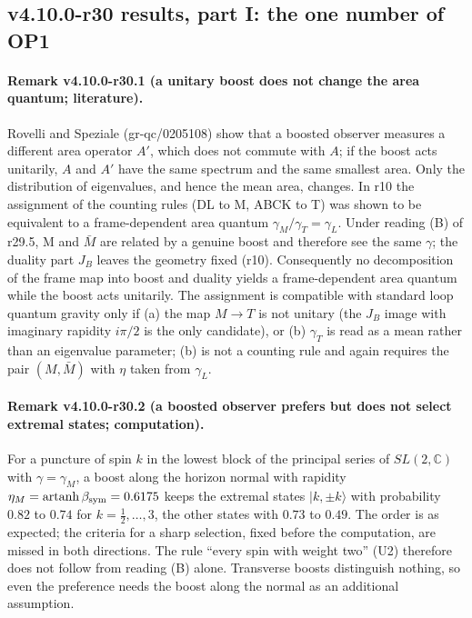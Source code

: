 \subsection*{v4.10.0-r30 results, part I: the one number of OP1}
\label{subsec:v4100-r30-results-op1}

\paragraph{Remark v4.10.0-r30.1 (a unitary boost does not change the area quantum; literature).}
Rovelli and Speziale (gr-qc/0205108) show that a boosted observer measures a different area operator \(A'\), which does not commute with \(A\); if the
boost acts unitarily, \(A\) and \(A'\) have the same spectrum and the same smallest area.  Only the distribution of eigenvalues, and hence the mean
area, changes.  In r10 the assignment of the counting rules (DL to M, ABCK to T) was shown to be equivalent to a frame-dependent area quantum
\(\gamma_M/\gamma_T=\gamma_L\).  Under reading (B) of r29.5, M and \(\bar M\) are related by a genuine boost and therefore see the same \(\gamma\);
the duality part \(J_B\) leaves the geometry fixed (r10).  Consequently no decomposition of the frame map into boost and duality yields a
frame-dependent area quantum while the boost acts unitarily.  The assignment is compatible with standard loop quantum gravity only if
(a) the map \(M\to T\) is not unitary (the \(J_B\) image with imaginary rapidity \(i\pi/2\) is the only candidate), or (b) \(\gamma_T\) is read as a
mean rather than an eigenvalue parameter; (b) is not a counting rule and again requires the pair \((M,\bar M)\) with \(\eta\) taken from \(\gamma_L\).

\paragraph{Remark v4.10.0-r30.2 (a boosted observer prefers but does not select extremal states; computation).}
For a puncture of spin \(k\) in the lowest block of the principal series of \(SL(2,\mathbb C)\) with \(\gamma=\gamma_M\), a boost along the horizon
normal with rapidity \(\eta_M=\operatorname{artanh}\beta_{\rm sym}=0.6175\) keeps the extremal states \(|k,\pm k\rangle\) with probability
\(0.82\) to \(0.74\) for \(k=\tfrac12,\dots,3\), the other states with \(0.73\) to \(0.49\).  The order is as expected; the criteria for a sharp
selection, fixed before the computation, are missed in both directions.  The rule ``every spin with weight two'' (U2) therefore does not follow from
reading (B) alone.  Transverse boosts distinguish nothing, so even the preference needs the boost along the normal as an additional assumption.

